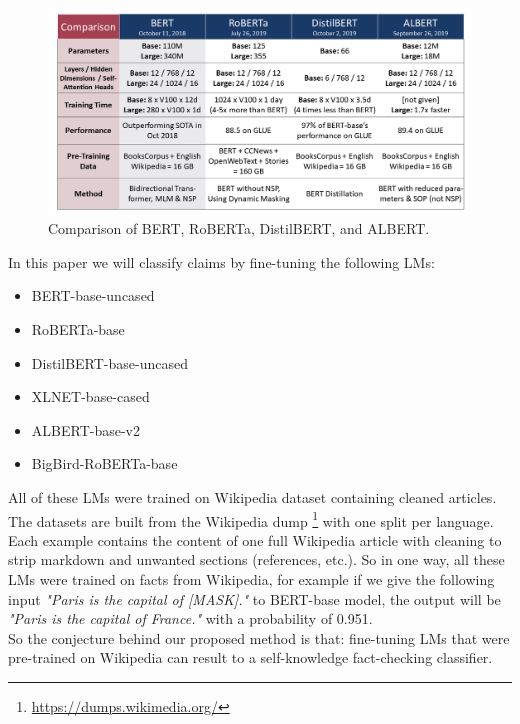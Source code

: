 \documentclass[conference]{IEEEtran}
\begin{document}
\begin{figure}[htp]
    \centering
    \includegraphics[scale=0.28]{lm_compar.png}
    \caption[Comparison]{Comparison of BERT, RoBERTa, DistilBERT, and ALBERT.\footnotemark}
    \label{fig:lm_compar}
\end{figure}

In this paper we will classify claims by fine-tuning the following LMs:

\begin{itemize}
\item BERT-base-uncased \cite{devlin2018bert}
\item RoBERTa-base \cite{liu2019roberta}
\item DistilBERT-base-uncased \cite{sanh2019distilbert}
\item XLNET-base-cased \cite{yang2019xlnet}
\item ALBERT-base-v2 \cite{lan2019albert}
\item BigBird-RoBERTa-base \cite{zaheer2020big}\\
\end{itemize}

All of these LMs were trained on Wikipedia dataset containing cleaned articles. The datasets are built from the Wikipedia dump \footnote{\url{https://dumps.wikimedia.org/}} with one split per language. Each example contains the content of one full Wikipedia article with cleaning to strip markdown and unwanted sections (references, etc.). So in one way, all these LMs were trained on facts from Wikipedia, for example if we give the following input \textit{"Paris is the capital of [MASK]."} to BERT-base model, the output will be \textit{"Paris is the capital of France."} with a probability of 0.951.\\
So the conjecture behind our proposed method is that: fine-tuning LMs that were pre-trained on Wikipedia can result to a self-knowledge fact-checking classifier.
\end{document}
